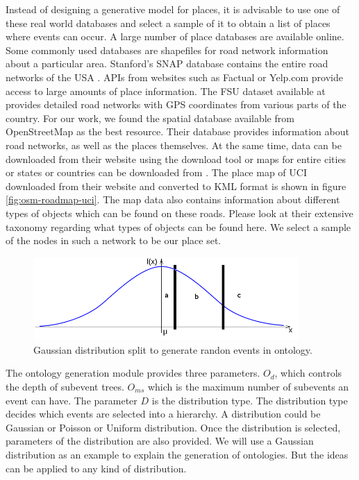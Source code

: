 Instead of designing a generative model for places, it is advisable to use one of these real world databases and select a sample of it to obtain a list of places where events can occur. A large number of place databases are available online. Some commonly used databases are shapefiles \cite{esri:tigerline} for road network information about a particular area. Stanford's SNAP database contains the entire road networks of the USA \cite{stanford:snap}. APIs from websites such as Factual or Yelp.com provide access to large amounts of place information. The FSU dataset available at \cite{fsu:spatial} provides detailed road networks with GPS coordinates from various parts of the country. For our work, we found the spatial database available from OpenStreetMap as the best resource. Their database provides information about road networks, as well as the places themselves. At the same time, data can be downloaded from their website using the download tool or maps for entire cities or states or countries can be downloaded from \cite{cloudmade:download}. The place map of UCI downloaded from their website and converted to KML format is shown in figure \ref{fig:osm-roadmap-uci}. The map data also contains information about different types of objects which can be found on these roads. Please look at their extensive taxonomy \cite{osm:taxonomy} regarding what types of objects can be found here. We select a sample of the nodes in such a network to be our place set.

\begin{figure}[t]
\centering
\includegraphics[width=0.9\textwidth]{media/chapter5/perf/gaussian-split.png}
\caption{Gaussian distribution split to generate randon events in ontology.}
\label{fig:gaussian-split}
\end{figure}

The ontology generation module provides three parameters. $O_d$, which controls the depth of subevent trees. $O_{ms}$ which is the maximum number of subevents an event can have. The parameter $D$ is the distribution type. The distribution type decides which events are selected into a hierarchy. A distribution could be Gaussian or Poisson or Uniform distribution. Once the distribution is selected, parameters of the distribution are also provided. We will use a Gaussian distribution as an example to explain the generation of ontologies. But the ideas can be applied to any kind of distribution. 

